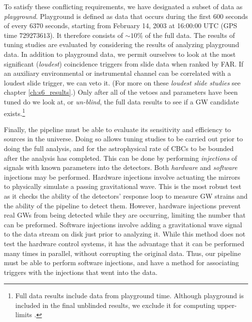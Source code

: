 To satisfy these conflicting requirements, we have designated a subset of data
as \emph{playground}. Playground is defined as data that occurs during the
first $600$ seconds of every $6370$ seconds, starting from February 14, 2003 at
16:00:00 UTC (GPS time $729273613$). It therefore consists of $\sim10\%$ of the
full data. The results of tuning studies are evaluated by considering the
results of analyzing playground data. In addition to playground data, we permit
ourselves to look at the most significant (\emph{loudest}) coincidence triggers
from slide data when ranked by \ac{FAR}. If an auxiliary environmental or
instrumental channel can be correlated with a loudest slide trigger, we can
veto it. (For more on these \emph{loudest slide studies} see chapter
\ref{ch:s6_results}.) Only after all of the vetoes and parameters have been
tuned do we look at, or \emph{un-blind}, the full data results to see if a
\ac{GW} candidate exists.\footnote{Full data results include data from
playground time. Although playground is included in the final unblinded
results, we exclude it for computing upper-limits \cite{Collaboration:2009tt,
Abbott:2009qj, Collaboration:S6CBClowmass}.} 

Finally, the pipeline must be able to evaluate its sensitivity and efficiency
to sources in the universe. Doing so allows tuning studies to be carried out
prior to doing the full analysis, and for the astrophysical rate of \acp{CBC}
to be bounded after the analysis has completed. This can be done by performing
\emph{injections} of signals with known parameters into the detectors. Both
\emph{hardware} and \emph{software} injections may be performed. Hardware
injections involve actuating the mirrors to physically simulate a passing
gravitational wave. This is the most robust test as it checks the ability of
the detectors' response loop to measure \ac{GW} strains and the ability of the
pipeline to detect them. However, hardware injections prevent real \acp{GW}
from being detected while they are occurring, limiting the number that can be
preformed.  Software injections involve adding a gravitational wave signal to
the data stream on disk just prior to analyzing it. While this method does not
test the hardware control systems, it has the advantage that it can be
performed many times in parallel, without corrupting the original data. Thus,
our pipeline must be able to perform software injections, and have a method for
associating triggers with the injections that went into the data.

